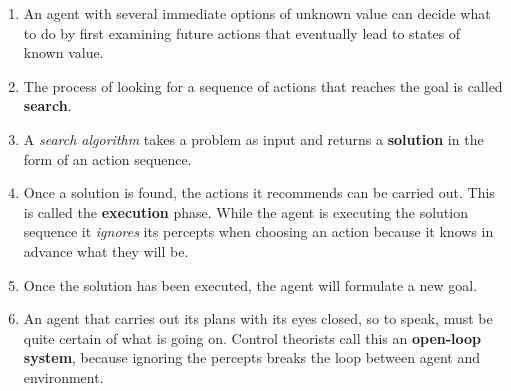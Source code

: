 \begin{enumerate}
    \item An agent with several immediate options of unknown value can decide what to do by first examining future actions that eventually lead to states of known value.
    \hfill \cite{ai/book/Artificial-Intelligence-A-Modern-Approach/Russell-Norvig}

    \item The process of looking for a sequence of actions that reaches the goal is called \textbf{search}.
    \hfill \cite{ai/book/Artificial-Intelligence-A-Modern-Approach/Russell-Norvig}

    \item A \textit{search algorithm} takes a problem as input and returns a \textbf{solution} in the form of an action sequence.
    \hfill \cite{ai/book/Artificial-Intelligence-A-Modern-Approach/Russell-Norvig}

    \item Once a solution is found, the actions it recommends can be carried out. This is called the \textbf{execution} phase.
    While the agent is executing the solution sequence it \textit{ignores} its percepts when choosing an action because it knows in advance what they will be.
    \hfill \cite{ai/book/Artificial-Intelligence-A-Modern-Approach/Russell-Norvig}

    \item Once the solution has been executed, the agent will formulate a new goal.
    \hfill \cite{ai/book/Artificial-Intelligence-A-Modern-Approach/Russell-Norvig}

    \item An agent that carries out its plans with its eyes closed, so to speak, must be quite certain of what is going on. Control theorists call this an \textbf{open-loop system}, because ignoring the percepts breaks the loop between agent and environment.
    \hfill \cite{ai/book/Artificial-Intelligence-A-Modern-Approach/Russell-Norvig}
\end{enumerate}








\vspace{0.5cm}


